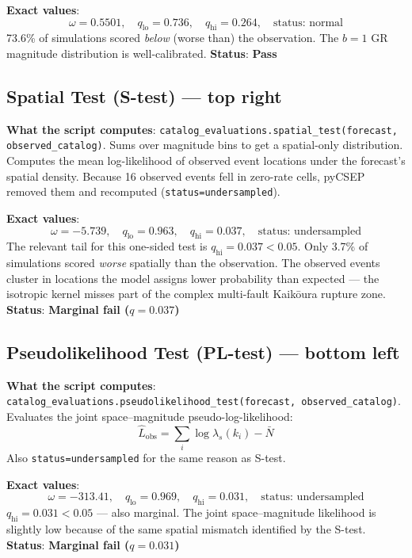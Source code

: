 \documentclass[12pt,a4paper]{article}
\begin{document}
\textbf{Exact values}:
\[
    \omega = 0.5501, \quad
    q_\text{lo} = 0.736, \quad q_\text{hi} = 0.264, \quad \text{status: normal}
\]
73.6\% of simulations scored \emph{below} (worse than) the observation.
The $b = 1$ GR magnitude distribution is well-calibrated.
\textbf{Status}: \textcolor{passgreen}{\textbf{Pass}}

\subsection{Spatial Test (S-test) --- top right}

\textbf{What the script computes}:
\newline
\texttt{catalog\_evaluations.spatial\_test(forecast, observed\_catalog)}.
Sums over magnitude bins to get a spatial-only distribution. Computes the
mean log-likelihood of observed event locations under the forecast's spatial
density. Because 16 observed events fell in zero-rate cells, pyCSEP removed
them and recomputed (\texttt{status=undersampled}).

\textbf{Exact values}:
\[
    \omega = -5.739, \quad
    q_\text{lo} = 0.963, \quad q_\text{hi} = 0.037, \quad \text{status: undersampled}
\]
The relevant tail for this one-sided test is $q_\text{hi} = 0.037 < 0.05$.
Only 3.7\% of simulations scored \emph{worse} spatially than the observation.
The observed events cluster in locations the model assigns lower probability
than expected --- the isotropic kernel misses part of the complex multi-fault
Kaik\={o}ura rupture zone.
\textbf{Status}: \textcolor{warnorange}{\textbf{Marginal fail ($q = 0.037$)}}

\subsection{Pseudolikelihood Test (PL-test) --- bottom left}

\textbf{What the script computes}:
\texttt{catalog\_evaluations.pseudolikelihood\_test(forecast, observed\_catalog)}.
Evaluates the joint space--magnitude pseudo-log-likelihood:
\[
    \hat{L}_\text{obs} = \sum_i \log \hat{\lambda}_s(k_i) - \bar{N}
\]
Also \texttt{status=undersampled} for the same reason as S-test.

\textbf{Exact values}:
\[
    \omega = -313.41, \quad
    q_\text{lo} = 0.969, \quad q_\text{hi} = 0.031, \quad \text{status: undersampled}
\]
$q_\text{hi} = 0.031 < 0.05$ --- also marginal. The joint
space--magnitude likelihood is slightly low because of the same
spatial mismatch identified by the S-test.
\textbf{Status}: \textcolor{warnorange}{\textbf{Marginal fail ($q = 0.031$)}}
\end{document}
